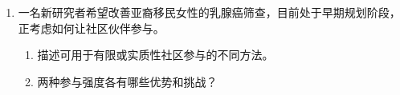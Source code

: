 \begin{enumerate}
\item 一名新研究者希望改善亚裔移民女性的乳腺癌筛查，目前处于早期规划阶段，正考虑如何让社区伙伴参与。
\begin{enumerate}
\item 描述可用于有限或实质性社区参与的不同方法。
\item 两种参与强度各有哪些优势和挑战？
\end{enumerate}
\end{enumerate}
